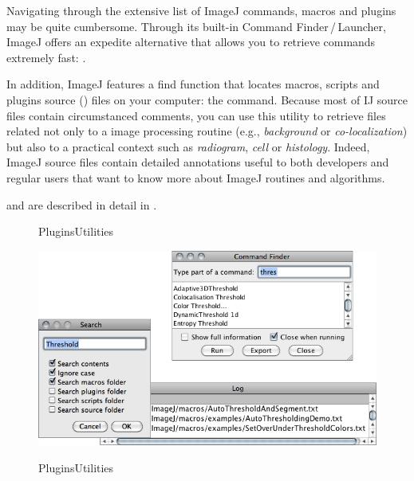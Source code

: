 Navigating through the extensive list of ImageJ commands, macros and
plugins may be quite cumbersome. Through its built-in Command Finder\,/\,Launcher\cite{C-ComandFinder},
ImageJ offers an expedite alternative that allows you to retrieve
commands extremely fast: \textsf{}.

In addition, ImageJ features a find function that locates macros,
scripts and plugins source () files on your computer:
the \textsf{}
command. Because most of IJ source files contain circumstanced comments,
you can use this utility to retrieve files related not only to a image
processing routine (e.g.,\emph{ background }or\emph{ co-localization})
but also to a practical context such as \emph{radiogram}, \emph{cell}
or \emph{histology}. Indeed, ImageJ source files contain detailed
annotations useful to both developers and regular users that want
to know more about ImageJ routines and algorithms.

\textsf{} and \textsf{}
are described in detail in \textsf{}.
\begin{figure}
\noindent \begin{centering}
\hspace{11.1em}\textsf{\small Plugins\lyxarrow{}Utilities\lyxarrow{}\vspace{3pt}
}
\par\end{centering}{\small \par}

\noindent \begin{centering}
\includegraphics[scale=0.55]{images/CommandFinderAndSearch}
\par\end{centering}

\noindent \centering{}\textsf{\small Plugins\lyxarrow{}Utilities\lyxarrow{}}
\end{figure}



